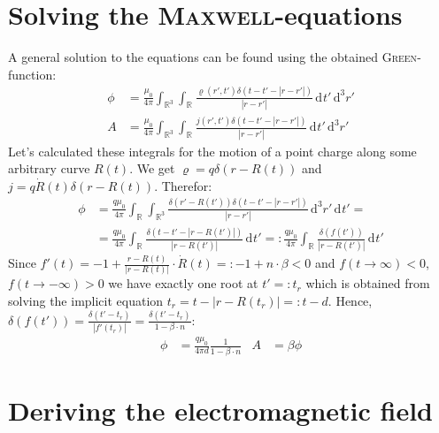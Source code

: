 \documentclass[a4paper,12pt]{article}
\newcommand{\intr}{}
\begin{document}
\section{Solving the \textsc{Maxwell}-equations}
A general solution to the equations can be found using the obtained \textsc{Green}-function:
\begin{align*}
\phi&=\frac{\mu_0}{4\pi}\intr\int_{\mathbb{R}^{3}}{\intr\int_{\mathbb{R}^{ }}{\frac{\varrho(r',t')\delta(t-t'-|r-r'|)}{|r-r'|}}\,\mathrm{d}^{ }t'}\,\mathrm{d}^{3}r'\\
A&=\frac{\mu_0}{4\pi}\intr\int_{\mathbb{R}^{3}}{\intr\int_{\mathbb{R}^{ }}{\frac{j(r',t')\delta(t-t'-|r-r'|)}{|r-r'|}}\,\mathrm{d}^{ }t'}\,\mathrm{d}^{3}r'
\end{align*}
Let's calculated these integrals for the motion of a point charge along some arbitrary curve $R(t)$. We get $\varrho=q\delta (r-R(t))$ and $j=q\dot{R}(t)\delta(r-R(t))$. Therefor:
\begin{align*}
\phi&=\frac{q\mu_0}{4\pi}\intr\int_{\mathbb{R}^{ }}{\intr\int_{\mathbb{R}^{3}}{\frac{\delta(r'-R(t'))\delta(t-t'-|r-r'|)}{|r-r'|}}\,\mathrm{d}^{3}r'}\,\mathrm{d}^{ }t'=\\
&=\frac{q\mu_0}{4\pi}\intr\int_{\mathbb{R}^{ }}{\frac{\delta(t-t'-|r-R(t')|)}{|r-R(t')|}}\,\mathrm{d}^{ }t'=:\frac{q\mu_0}{4\pi}\intr\int_{\mathbb{R}^{ }}{\frac{\delta(f(t'))}{|r-R(t')|}}\,\mathrm{d}^{ }t'
\end{align*}
Since $f'(t)=-1+\frac{r-R(t)}{|r-R(t)|}\cdot\dot{R}(t)=:-1+n\cdot\beta<0$ and $f(t\rightarrow\infty)<0$, $f(t\rightarrow -\infty)>0$ we have exactly one root at $t'=:t_r$ which is obtained from solving the implicit equation $t_r=t-|r-R(t_r)|=:t-d$. Hence, $\delta(f(t'))=\frac{\delta(t'-t_r)}{|f'(t_r)|}=\frac{\delta(t'-t_r)}{1-\beta\cdot n}$:
\begin{align*}
\phi&=\frac{q\mu_0}{4\pi d}\frac{1}{1-\beta\cdot n}&A&=\beta\phi
\end{align*}
\section{Deriving the electromagnetic field}
\end{document}
